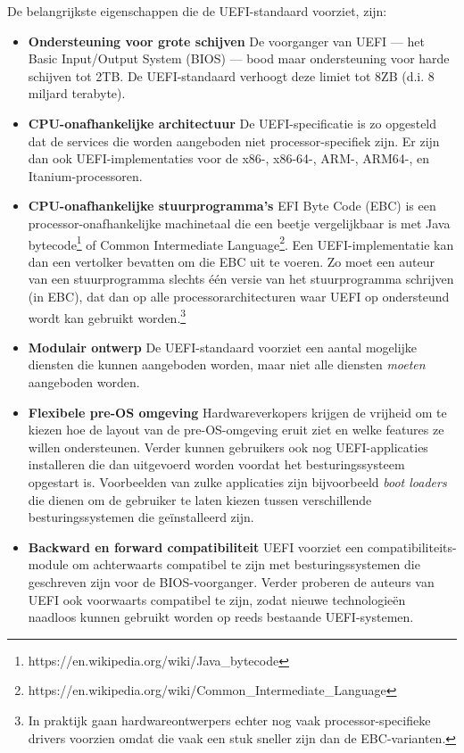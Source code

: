 De belangrijkste eigenschappen die de UEFI-standaard voorziet, zijn:

\begin{itemize}
\item \textbf{Ondersteuning voor grote schijven} De voorganger van UEFI ---{} het Basic Input/Output System (BIOS) ---{} bood maar ondersteuning voor harde schijven tot 2TB. De UEFI-standaard verhoogt deze limiet tot 8ZB (d.i. 8 miljard terabyte).
\item \textbf{CPU-onafhankelijke architectuur} De UEFI-specificatie is zo opgesteld dat de services die worden aangeboden niet processor-specifiek zijn. Er zijn dan ook UEFI-implementaties voor de x86-, x86-64-, ARM-, ARM64-, en Itanium-processoren.
\item \textbf{CPU-onafhankelijke stuurprogramma's} EFI Byte Code (EBC) is een processor-onafhankelijke machinetaal die een beetje vergelijkbaar is met Java bytecode\footnote{https://en.wikipedia.org/wiki/Java\_bytecode} of Common Intermediate Language\footnote{https://en.wikipedia.org/wiki/Common\_Intermediate\_Language}. Een UEFI-implementatie kan dan een vertolker bevatten om die EBC uit te voeren. Zo moet een auteur van een stuurprogramma slechts \'e\'en versie van het stuurprogramma schrijven (in EBC), dat dan op alle processorarchitecturen waar UEFI op ondersteund wordt kan gebruikt worden.\footnote{In praktijk gaan hardwareontwerpers echter nog vaak processor-specifieke drivers voorzien omdat die vaak een stuk sneller zijn dan de EBC-varianten.}
\item \textbf{Modulair ontwerp} De UEFI-standaard voorziet een aantal mogelijke diensten die kunnen aangeboden worden, maar niet alle diensten \emph{moeten} aangeboden worden.
\item \textbf{Flexibele pre-OS omgeving} Hardwareverkopers krijgen de vrijheid om te kiezen hoe de layout van de pre-OS-omgeving eruit ziet en welke features ze willen ondersteunen. Verder kunnen gebruikers ook nog UEFI-applicaties installeren die dan uitgevoerd worden voordat het besturingssysteem opgestart is. Voorbeelden van zulke applicaties zijn bijvoorbeeld \emph{boot loaders} die dienen om de gebruiker te laten kiezen tussen verschillende besturingssystemen die ge\"installeerd zijn.
\item \textbf{Backward en forward compatibiliteit} UEFI voorziet een compatibiliteits-module om achterwaarts compatibel te zijn met besturingssystemen die geschreven zijn voor de BIOS-voorganger. Verder proberen de auteurs van UEFI ook voorwaarts compatibel te zijn, zodat nieuwe technologie\"en naadloos kunnen gebruikt worden op reeds bestaande UEFI-systemen.
\end{itemize}


